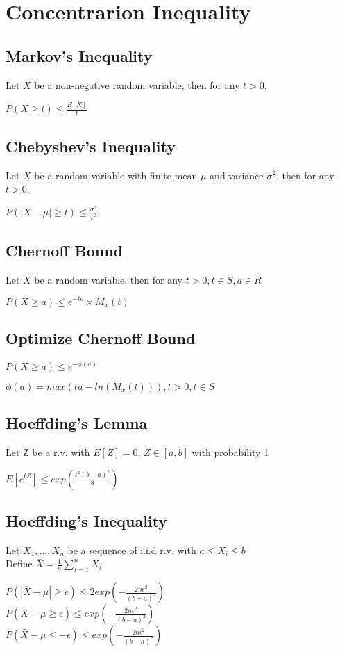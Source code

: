 \section{Concentrarion Inequality}
\subsection*{Markov's Inequality}
Let $X$ be a non-negative random variable, then for any $t>0$,
    
    $P(X\geq t)\leq \frac{E[X]}{t}$

\subsection*{Chebyshev's Inequality}
Let $X$ be a random variable with finite mean $\mu$ and variance $\sigma^2$, then for any $t>0$,

    $P(|X-\mu|\geq t)\leq \frac{\sigma^2}{t^2}$

\subsection*{Chernoff Bound}
Let $X$ be a random variable, then for any $t>0, t \in S, a \in R$

    $P(X\geq a)\leq e^{-ta}\times M_x(t)$

\subsection*{Optimize Chernoff Bound}
$P(X \geq a) \leq e^{-\phi(a)}$

$\phi(a) = max(ta-ln(M_x(t))), t>0, t \in S$

\subsection*{Hoeffding's Lemma}
Let Z be a r.v. with $E[Z] = 0$, $Z \in [a, b]$ with probability 1

$E[e^{tZ}]\leq exp(\frac{t^2(b-a)^2}{8})$

\subsection*{Hoeffding's Inequality}
Let $X_1, ..., X_n$ be a sequence of i.i.d r.v. with $a \leq X_i \leq b$ \\
Define $\bar{X} = \frac{1}{n}\sum_{i=1}^{n}X_i$

$P(|\bar{X} - \mu| \geq \epsilon) \leq 2exp(-\frac{2n\epsilon^2}{(b-a)^2})$\\
$P(\bar{X} - \mu \geq \epsilon) \leq exp(-\frac{2n\epsilon^2}{(b-a)^2})$\\
$P(\bar{X} - \mu \leq -\epsilon) \leq exp(-\frac{2n\epsilon^2}{(b-a)^2})$

